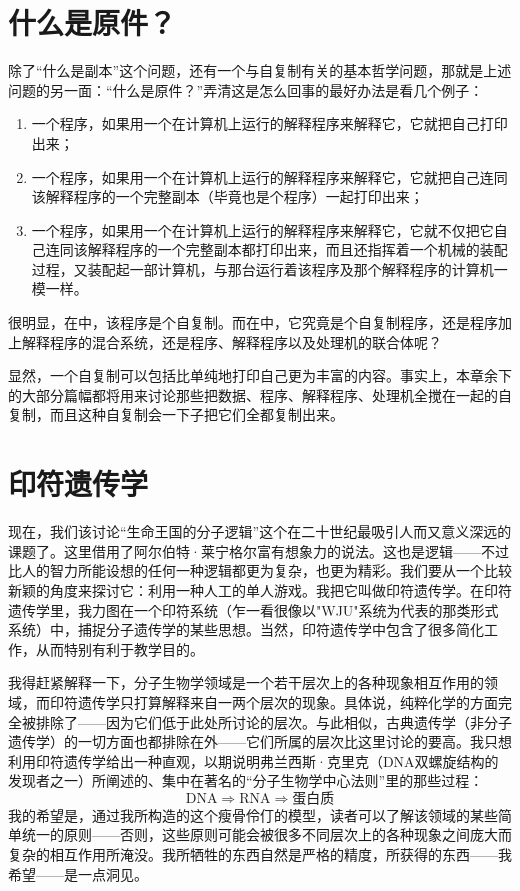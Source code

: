 \section{什么是原件？}

除了“什么是副本”这个问题，还有一个与自复制有关的基本哲学问题，那就是上述问题的另一面：“什么是原件？”弄清这是怎么回事的最好办法是看几个例子：
\begin{enumerate}
\item 一个程序，如果用一个在计算机上运行的解释程序来解释它，它就把自己打印出来；
\item 一个程序，如果用一个在计算机上运行的解释程序来解释它，它就把自己连同该解释程序的一个完整副本（毕竟也是个程序）一起打印出来；
\item 一个程序，如果用一个在计算机上运行的解释程序来解释它，它就不仅把它自己连同该解释程序的一个完整副本都打印出来，而且还指挥着一个机械的装配过程，又装配起一部计算机，与那台运行着该程序及那个解释程序的计算机一模一样。
\end{enumerate}
很明显，在中，该程序是个自复制。而在中，它究竟是个自复制程序，还是程序加上解释程序的混合系统，还是程序、解释程序以及处理机的联合体呢？

显然，一个自复制可以包括比单纯地打印自己更为丰富的内容。事实上，本章余下的大部分篇幅都将用来讨论那些把数据、程序、解释程序、处理机全搅在一起的自复制，而且这种自复制会一下子把它们全都复制出来。

\section{印符遗传学}

现在，我们该讨论“生命王国的分子逻辑”这个在二十世纪最吸引人而又意义深远的课题了。这里借用了阿尔伯特·莱宁格尔富有想象力的说法。这也是逻辑——不过比人的智力所能设想的任何一种逻辑都更为复杂，也更为精彩。我们要从一个比较新颖的角度来探讨它：利用一种人工的单人游戏。我把它叫做印符遗传学。在印符遗传学里，我力图在一个印符系统（乍一看很像以"WJU"系统为代表的那类形式系统）中，捕捉分子遗传学的某些思想。当然，印符遗传学中包含了很多简化工作，从而特别有利于教学目的。

我得赶紧解释一下，分子生物学领域是一个若干层次上的各种现象相互作用的领域，而印符遗传学只打算解释来自一两个层次的现象。具体说，纯粹化学的方面完全被排除了——因为它们低于此处所讨论的层次。与此相似，古典遗传学（非分子遗传学）的一切方面也都排除在外——它们所属的层次比这里讨论的要高。我只想利用印符遗传学给出一种直观，以期说明弗兰西斯·克里克（DNA双螺旋结构的发现者之一）所阐述的、集中在著名的“分子生物学中心法则”里的那些过程：
\[
\mathrm{DNA}\Rightarrow\mathrm{RNA}\Rightarrow\text{蛋白质}
\]
我的希望是，通过我所构造的这个瘦骨伶仃的模型，读者可以了解该领域的某些简单统一的原则——否则，这些原则可能会被很多不同层次上的各种现象之间庞大而复杂的相互作用所淹没。我所牺牲的东西自然是严格的精度，所获得的东西——我希望——是一点洞见。

